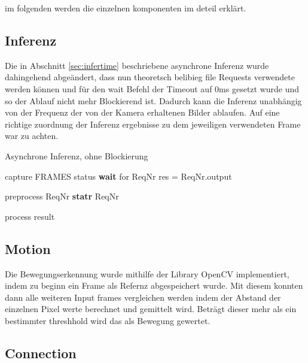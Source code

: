 im folgenden werden die einzelnen komponenten
im deteil erklärt.


\subsection*{Inferenz}
Die in Abschnitt \ref{sec:infertime} beschriebene asynchrone 
Inferenz wurde dahingehend abgeändert, dass nun theoretsch belibieg file 
Requests verwendete werden können und für den wait Befehl der 
Timeout auf 0ms gesetzt wurde und so der Ablauf nicht mehr Blockierend 
ist. Dadurch kann die Inferenz unabhängig von der Frequenz der 
von der Kamera erhaltenen Bilder ablaufen.
Auf eine richtige zuordnung der Inferenz ergebnisse zu dem 
jeweiligen verwendeten Frame war zu achten.


\begin{algorithm}[H]
    \caption{Asynchrone Inferenz, ohne Blockierung}
    \begin{algorithmic}
    \WHILE{\TRUE}
    \STATE capture FRAMES
            \STATE status \textbf{wait} for ReqNr
                \STATE res = ReqNr.output
            \ENDIF
            
                \STATE preprocess ReqNr
                \STATE \textbf{statr} ReqNr
            \ENDIF

                \STATE process result
            \ENDIF
        \ENDFOR
    \ENDWHILE
    \end{algorithmic}
\end{algorithm}    




\subsection*{Motion}

Die Bewegungserkennung wurde mithilfe der Library OpenCV implementiert, indem
zu beginn ein Frame als Refernz abgespeichert wurde.
Mit diesem konnten dann alle weiteren Input frames vergleichen werden 
indem der Abstand der einzelnen Pixel werte berechnet und gemittelt wird.
Beträgt dieser mehr als ein bestimmter threshhold wird das als Bewegung 
gewertet.


\subsection*{Connection}

